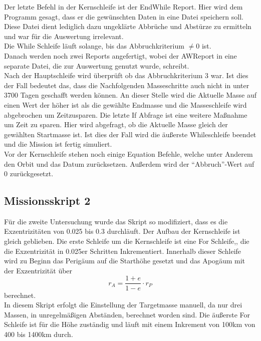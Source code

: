 Der letzte Befehl in der Kernschleife ist der EndWhile Report. Hier wird dem Programm gesagt, dass er die gewünschten Daten in eine Datei speichern soll. Diese Datei dient lediglich dazu ungeklärte Abbrüche und Abstürze zu ermitteln und war für die Auswertung irrelevant.\\
Die While Schleife läuft solange, bis das Abbruchkriterium $\neq 0$ ist.\\
Danach werden noch zwei Reports angefertigt, wobei der AWReport in eine separate Datei, die zur Auswertung genutzt wurde, schreibt.\\
Nach der Hauptschleife wird überprüft ob das Abbruchkriterium 3 war. Ist dies der Fall bedeutet das, dass die Nachfolgenden Masseschritte auch nicht in unter 3700 Tagen geschafft werden können. An dieser Stelle wird die Aktuelle Masse auf einen Wert der höher ist als die gewählte Endmasse und die Masseschleife wird abgebrochen um Zeitzusparen. Die letzte If Abfrage ist eine weitere Maßnahme um Zeit zu sparen. Hier wird abgefragt, ob die Aktuelle Masse gleich der gewählten Startmasse ist. Ist dies der Fall wird die äußerste Whileschleife beendet und die Mission ist fertig simuliert.\\
Vor der Kernschleife stehen noch einige Equation Befehle, welche unter Anderem den Orbit und das Datum zurücksetzen. Außerdem wird der “Abbruch”-Wert auf 0 zurückgesetzt.




\subsection{Missionsskript 2}

Für die zweite Untersuchung wurde das Skript so modifiziert, dass es die Exzentrizitäten von 0.025 bis 0.3 durchläuft.
Der Aufbau der Kernschleife ist gleich geblieben. Die erste Schleife um die Kernschleife ist eine For Schleife,, die die Exzentrizität in 0.025er Schritten Inkrementiert. Innerhalb dieser Schleife wird zu Beginn das Perigäum auf die Starthöhe gesetzt und das Apogäum mit der Exzentrizität über
\begin{equation}
r_A = \frac{1+e}{1-e}\cdot r_P
\label{apoapsis}
\end{equation}
berechnet.\\
In diesem Skript erfolgt die Einstellung der Targetmasse manuell, da nur drei Massen, in unregelmäßigen Abständen, berechnet worden sind. Die äußerste For Schleife ist für die Höhe zuständig und läuft mit einem Inkrement von 100km von 400 bis 1400km durch.

